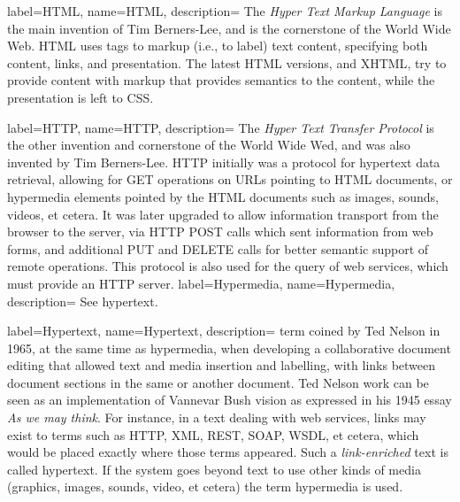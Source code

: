 {
    label={HTML},
    name={HTML},
    description={
    	The \emph{Hyper Text Markup Language} is the main invention of
        Tim Berners-Lee, and is the cornerstone of the \gls{World Wide
        Web}. HTML uses \gls{tags} to markup (i.e., to label) text
        content, specifying both content, links, and presentation. The
        latest HTML versions, and \gls{XHTML}, try to provide content
        with markup that provides semantics to the content, while the
        presentation is left to CSS.
    }
}

{
    label={HTTP},
    name={HTTP},
    description={
    	The \emph{Hyper Text Transfer Protocol} is the other invention
        and cornerstone of the \gls{World Wide Wed}, and was also
        invented by Tim Berners-Lee. HTTP initially was a protocol for
        hypertext data retrieval, allowing for GET operations on
        \gls{URL}s pointing to HTML documents, or hypermedia elements
        pointed by the HTML documents such as images, sounds, videos,
        et cetera. It was later upgraded to allow information transport from
        the browser to the server, via HTTP POST calls which sent
        information from web forms, and additional PUT and DELETE calls
        for better semantic support of remote operations. This protocol
        is also used for the query of web services, which must provide
        an HTTP server.
    }
}
{
    label={Hypermedia},
    name={Hypermedia},
    description={
    	See \gls{hypertext}.
    }
}

{
    label={Hypertext},
    name={Hypertext},
    description={
    	term coined by Ted Nelson in 1965, at the same time as
        hypermedia, when developing a collaborative document editing
        that allowed text and media insertion and labelling, with links
        between document sections in the same or another document. Ted
        Nelson work can be seen as an implementation of Vannevar Bush
        vision as expressed in his 1945 essay \emph{As we may think}.
        For instance, in a text dealing with web services, links may
        exist to terms such as \gls{HTTP}, \gls{XML}, \gls{REST},
        \gls{SOAP}, \gls{WSDL}, et cetera,
		which would be placed exactly where
        those terms appeared. Such a \emph{link-enriched} text is
        called hypertext. If the system goes beyond text to use other
        kinds of media (graphics, images, sounds, video, et cetera) the term
        hypermedia is used.
    }
}

